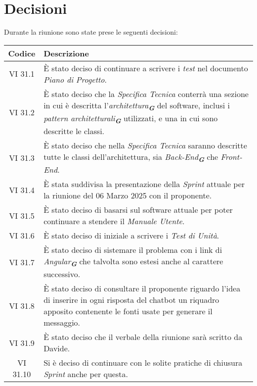
\section{Decisioni}

Durante la riunione sono state prese le seguenti decisioni:

\vspace{0.5cm}

\begin{table}[htbp]
    \centering
    \begin{tabular}{|c|p{}|}
        \hline
        \rowcolor[gray]{0.75}
        \textbf{Codice} & \textbf{Descrizione}\\
        \hline
        VI 31.1 & È stato deciso di continuare a scrivere i \emph{test} nel documento \emph{Piano di Progetto}.\\
        \hline
        VI 31.2 & È stato deciso che la \emph{Specifica Tecnica} conterrà una sezione in cui è descritta l'\emph{architettura}\textsubscript{\textit{\textbf{G}}} del software, inclusi i \emph{pattern architetturali}\textsubscript{\textit{\textbf{G}}} utilizzati, e una in cui sono descritte le classi.\\
        \hline
        VI 31.3 & È stato deciso che nella \emph{Specifica Tecnica} saranno descritte tutte le classi dell'architettura, sia \emph{Back-End}\textsubscript{\textit{\textbf{G}}} che \emph{Front-End}.\\
        \hline 
        VI 31.4 & È stata suddivisa la presentazione della \emph{Sprint} attuale per la riunione del 06 Marzo 2025 con il proponente. \\
        \hline
        VI 31.5 & È stato deciso di basarsi sul software attuale per poter continuare a stendere il \emph{Manuale Utente}.\\
        \hline
        VI 31.6 & È stato deciso di iniziale a scrivere i \emph{Test di Unità}. \\
        \hline
        VI 31.7 & È stato deciso di sistemare il problema con i link di \emph{Angular}\textsubscript{\textit{\textbf{G}}} che talvolta sono estesi anche al carattere successivo. \\
        \hline
        VI 31.8 & È stato deciso di consultare il proponente riguardo l'idea di inserire in ogni risposta del chatbot un riquadro apposito contenente le fonti usate per generare il messaggio. \\
        \hline
        VI 31.9 & È stato deciso che il verbale della riunione sarà scritto da Davide. \\
        \hline
        VI 31.10 & Si è deciso di continuare con le solite pratiche di chiusura \emph{Sprint} anche per questa. \\
        \hline
    \end{tabular}
\end{table}